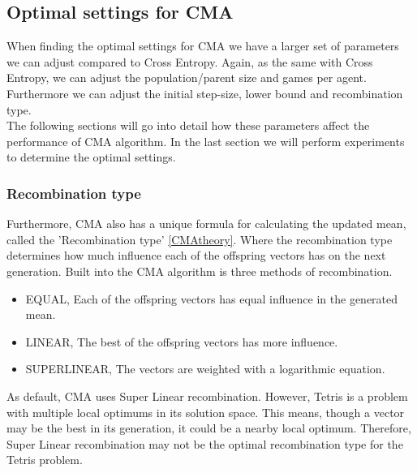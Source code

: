 \subsection{Optimal settings 
for CMA \label{optimalsettingscma}}

When finding the optimal settings for CMA we have a larger set of parameters we can adjust compared
to Cross Entropy. Again, as the same with Cross Entropy, we can adjust the population/parent size and
games per agent. Furthermore we can adjust the initial step-size, lower bound and recombination type.\\
The following sections will go into detail how these parameters affect the performance of CMA
algorithm. In the last section we will perform experiments to determine the optimal settings.


\subsubsection{Recombination type}
Furthermore, CMA also has a unique formula for calculating the updated mean,
called the 'Recombination type' \ref{CMAtheory}. Where the recombination type
determines how much influence each of the offspring vectors has on the next
generation. Built into the CMA algorithm is three methods of recombination. 
\begin{itemize}
\item EQUAL, Each of the offspring vectors has equal influence in the generated mean.
\item LINEAR, The best of the offspring vectors has more influence. 
\item SUPERLINEAR, The vectors are weighted with a logarithmic equation.
\end{itemize}
As default, CMA uses Super Linear recombination. However, Tetris is a problem
with multiple local optimums in its solution space. This means, though a vector may be the best in its generation, it could be a nearby local optimum. Therefore, Super Linear recombination may not be the optimal recombination type for the Tetris problem.\\

